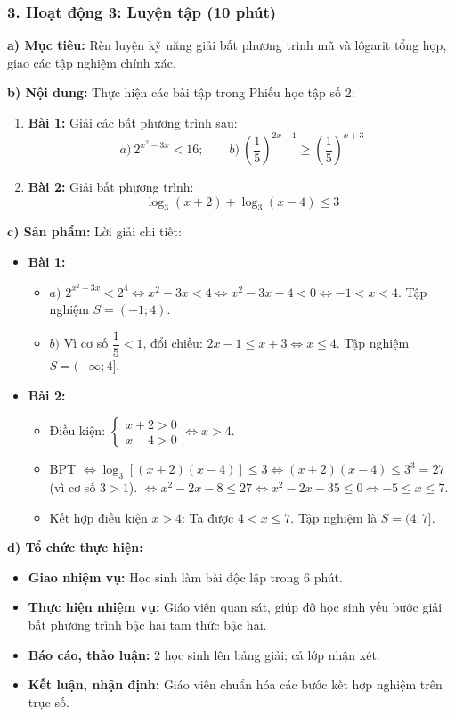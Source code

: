 \documentclass[12pt, a4paper]{article}
\begin{document}
\subsubsection*{3. Hoạt động 3: Luyện tập (10 phút)}

\noindent \textbf{a) Mục tiêu:}
Rèn luyện kỹ năng giải bất phương trình mũ và lôgarit tổng hợp, giao các tập nghiệm chính xác.

\noindent \textbf{b) Nội dung:}
Thực hiện các bài tập trong Phiếu học tập số 2:
\begin{enumerate}[leftmargin=0.6cm]
    \item \textbf{Bài 1:} Giải các bất phương trình sau:
    $$a) \ 2^{x^2 - 3x} < 16; \qquad b) \ \left(\dfrac{1}{5}\right)^{2x - 1} \ge \left(\dfrac{1}{5}\right)^{x + 3}$$
    \item \textbf{Bài 2:} Giải bất phương trình:
    $$\log_3 (x + 2) + \log_3 (x - 4) \le 3$$
\end{enumerate}

\noindent \textbf{c) Sản phẩm:}
Lời giải chi tiết:
\begin{itemize}
    \item \textbf{Bài 1:}
    \begin{itemize}
        \item $a)$ $2^{x^2 - 3x} < 2^4 \iff x^2 - 3x < 4 \iff x^2 - 3x - 4 < 0 \iff -1 < x < 4$. Tập nghiệm $S = (-1; 4)$.
        \item $b)$ Vì cơ số $\dfrac{1}{5} < 1$, đổi chiều: $2x - 1 \le x + 3 \iff x \le 4$. Tập nghiệm $S = (-\infty; 4]$.
    \end{itemize}
    \item \textbf{Bài 2:}
    \begin{itemize}
        \item Điều kiện: $\begin{cases} x + 2 > 0 \\ x - 4 > 0 \end{cases} \iff x > 4$.
        \item BPT $\iff \log_3 [(x + 2)(x - 4)] \le 3 \iff (x + 2)(x - 4) \le 3^3 = 27$ (vì cơ số $3 > 1$).
        $\iff x^2 - 2x - 8 \le 27 \iff x^2 - 2x - 35 \le 0 \iff -5 \le x \le 7$.
        \item Kết hợp điều kiện $x > 4$: Ta được $4 < x \le 7$.
        Tập nghiệm là $S = (4; 7]$.
    \end{itemize}
\end{itemize}

\noindent \textbf{d) Tổ chức thực hiện:}
\begin{itemize}[leftmargin=0.6cm]
    \item \textbf{Giao nhiệm vụ:} Học sinh làm bài độc lập trong 6 phút.
    \item \textbf{Thực hiện nhiệm vụ:} Giáo viên quan sát, giúp đỡ học sinh yếu bước giải bất phương trình bậc hai tam thức bậc hai.
    \item \textbf{Báo cáo, thảo luận:} 2 học sinh lên bảng giải; cả lớp nhận xét.
    \item \textbf{Kết luận, nhận định:} Giáo viên chuẩn hóa các bước kết hợp nghiệm trên trục số.
\end{itemize}
\end{document}
